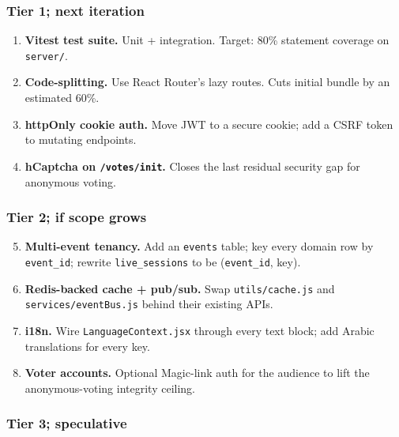 \subsubsection*{Tier 1; next iteration}

\begin{enumerate}[leftmargin=*]
  \item \textbf{Vitest test suite.} Unit + integration. Target:
        80\% statement coverage on \texttt{server/}.
  \item \textbf{Code-splitting.} Use React Router's lazy routes. Cuts
        initial bundle by an estimated 60\%.
  \item \textbf{httpOnly cookie auth.} Move JWT to a secure cookie;
        add a CSRF token to mutating endpoints.
  \item \textbf{hCaptcha on \texttt{/votes/init}.} Closes the last
        residual security gap for anonymous voting.
\end{enumerate}

\subsubsection*{Tier 2; if scope grows}

\begin{enumerate}[leftmargin=*]
  \setcounter{enumi}{4}
  \item \textbf{Multi-event tenancy.} Add an \texttt{events} table; key
        every domain row by \texttt{event\_id}; rewrite
        \texttt{live\_sessions} to be (\texttt{event\_id}, key).
  \item \textbf{Redis-backed cache + pub/sub.} Swap \texttt{utils/cache.js}
        and \texttt{services/eventBus.js} behind their existing APIs.
  \item \textbf{i18n.} Wire \texttt{LanguageContext.jsx} through every
        text block; add Arabic translations for every key.
  \item \textbf{Voter accounts.} Optional Magic-link auth for the
        audience to lift the anonymous-voting integrity ceiling.
\end{enumerate}

\subsubsection*{Tier 3; speculative}

